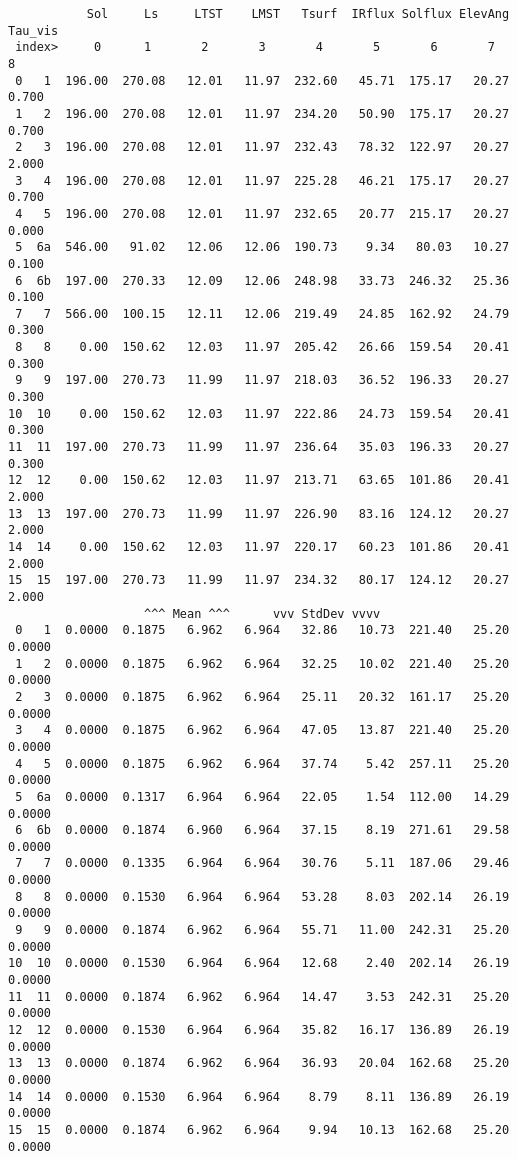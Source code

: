 \documentclass{article}
\begin{document}
\begin{table}
\begin{verbatim}
           Sol     Ls     LTST    LMST   Tsurf  IRflux Solflux ElevAng  Tau_vis
 index>     0      1       2       3       4       5       6       7       8 
 0   1  196.00  270.08   12.01   11.97  232.60   45.71  175.17   20.27   0.700
 1   2  196.00  270.08   12.01   11.97  234.20   50.90  175.17   20.27   0.700
 2   3  196.00  270.08   12.01   11.97  232.43   78.32  122.97   20.27   2.000
 3   4  196.00  270.08   12.01   11.97  225.28   46.21  175.17   20.27   0.700
 4   5  196.00  270.08   12.01   11.97  232.65   20.77  215.17   20.27   0.000
 5  6a  546.00   91.02   12.06   12.06  190.73    9.34   80.03   10.27   0.100
 6  6b  197.00  270.33   12.09   12.06  248.98   33.73  246.32   25.36   0.100
 7   7  566.00  100.15   12.11   12.06  219.49   24.85  162.92   24.79   0.300
 8   8    0.00  150.62   12.03   11.97  205.42   26.66  159.54   20.41   0.300
 9   9  197.00  270.73   11.99   11.97  218.03   36.52  196.33   20.27   0.300
10  10    0.00  150.62   12.03   11.97  222.86   24.73  159.54   20.41   0.300
11  11  197.00  270.73   11.99   11.97  236.64   35.03  196.33   20.27   0.300
12  12    0.00  150.62   12.03   11.97  213.71   63.65  101.86   20.41   2.000
13  13  197.00  270.73   11.99   11.97  226.90   83.16  124.12   20.27   2.000
14  14    0.00  150.62   12.03   11.97  220.17   60.23  101.86   20.41   2.000
15  15  197.00  270.73   11.99   11.97  234.32   80.17  124.12   20.27   2.000
                   ^^^ Mean ^^^      vvv StdDev vvvv 
 0   1  0.0000  0.1875   6.962   6.964   32.86   10.73  221.40   25.20  0.0000
 1   2  0.0000  0.1875   6.962   6.964   32.25   10.02  221.40   25.20  0.0000
 2   3  0.0000  0.1875   6.962   6.964   25.11   20.32  161.17   25.20  0.0000
 3   4  0.0000  0.1875   6.962   6.964   47.05   13.87  221.40   25.20  0.0000
 4   5  0.0000  0.1875   6.962   6.964   37.74    5.42  257.11   25.20  0.0000
 5  6a  0.0000  0.1317   6.964   6.964   22.05    1.54  112.00   14.29  0.0000
 6  6b  0.0000  0.1874   6.960   6.964   37.15    8.19  271.61   29.58  0.0000
 7   7  0.0000  0.1335   6.964   6.964   30.76    5.11  187.06   29.46  0.0000
 8   8  0.0000  0.1530   6.964   6.964   53.28    8.03  202.14   26.19  0.0000
 9   9  0.0000  0.1874   6.962   6.964   55.71   11.00  242.31   25.20  0.0000
10  10  0.0000  0.1530   6.964   6.964   12.68    2.40  202.14   26.19  0.0000
11  11  0.0000  0.1874   6.962   6.964   14.47    3.53  242.31   25.20  0.0000
12  12  0.0000  0.1530   6.964   6.964   35.82   16.17  136.89   26.19  0.0000
13  13  0.0000  0.1874   6.962   6.964   36.93   20.04  162.68   25.20  0.0000
14  14  0.0000  0.1530   6.964   6.964    8.79    8.11  136.89   26.19  0.0000
15  15  0.0000  0.1874   6.962   6.964    9.94   10.13  162.68   25.20  0.0000
\end{verbatim}
\vspace{-3.0mm}
\hrulefill \end{table}
\end{document}
